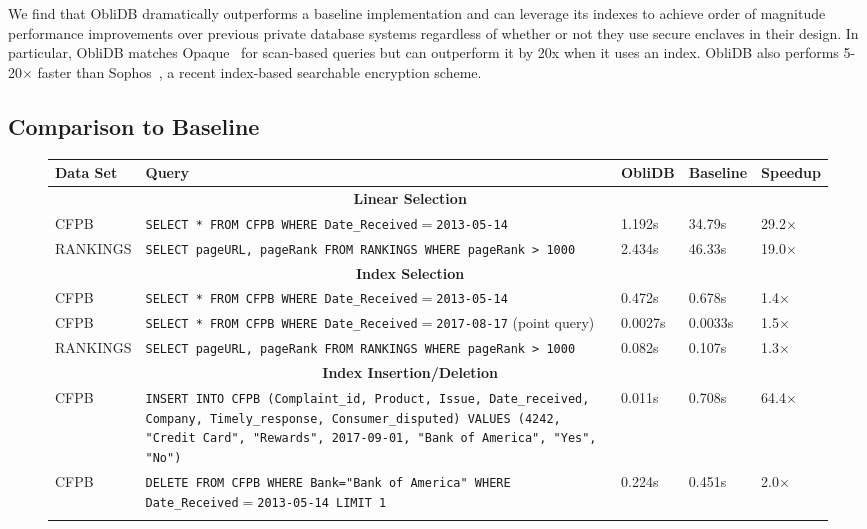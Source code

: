 \documentclass[letterpaper,twocolumn,10pt]{article}
\def\name/{ObliDB}
\begin{document}
We find that \name/ dramatically outperforms a baseline implementation and can leverage its indexes to achieve order of magnitude performance improvements over previous private database systems regardless of whether or not they use secure enclaves in their design. In particular, \name/ matches Opaque~\cite{ZDB+17} for scan-based queries but can outperform it by 20x when it uses an index. \name/ also performs 5-20$\times$ faster than Sophos~\cite{Bost16}, a recent index-based searchable encryption scheme.

\subsection{Comparison to Baseline}
\begin{figure}
\small
\centering
\begin{tabular}{p{2.2cm} p{8cm} l l l}
 \textbf{Data Set}& \textbf{Query}& \textbf{\name/} & \textbf{Baseline} & \textbf{Speedup}\\ \hline\rule{0pt}{2ex}
 &\multicolumn{2}{c}{\textbf{Linear Selection}}\\\rule{0pt}{2ex}
CFPB & \texttt{SELECT * FROM CFPB WHERE Date\_Received$=$2013-05-14}& 1.192s & 34.79s & 29.2$\times$\\\rule{0pt}{2ex}
RANKINGS & \texttt{SELECT pageURL, pageRank FROM RANKINGS WHERE pageRank > 1000 }& 2.434s & 46.33s& 19.0$\times$ \\\rule{0pt}{2ex}
&\multicolumn{2}{c}{\textbf{Index Selection}}\\\rule{0pt}{2ex}
CFPB & \texttt{SELECT * FROM CFPB WHERE Date\_Received$=$2013-05-14} & 0.472s & 0.678s & 1.4$\times$\\\rule{0pt}{2ex}
CFPB & \texttt{SELECT * FROM CFPB WHERE Date\_Received$=$2017-08-17} (point query) & 0.0027s & 0.0033s & 1.5$\times$\\\rule{0pt}{2ex}
RANKINGS & \texttt{SELECT pageURL, pageRank FROM RANKINGS WHERE pageRank > 1000 }& 0.082s & 0.107s& 1.3$\times$ \\\rule{0pt}{2ex}
&\multicolumn{2}{c}{\textbf{Index Insertion/Deletion}}\\\rule{0pt}{2ex}
CFPB & \texttt{INSERT INTO CFPB (Complaint\_id, Product, Issue, Date\_received, Company, Timely\_response, Consumer\_disputed) VALUES (4242, "Credit Card", "Rewards", 2017-09-01, "Bank of America", "Yes", "No")}& 0.011s& 0.708s& 64.4$\times$ \\\rule{0pt}{2ex}
CFPB & \texttt{DELETE FROM CFPB WHERE Bank="Bank of America" WHERE Date\_Received$=$2013-05-14 LIMIT 1}& 0.224s& 0.451s& 2.0$\times$ \\\rule{0pt}{2ex}

\end{tabular}
\end{figure}
\end{document}
